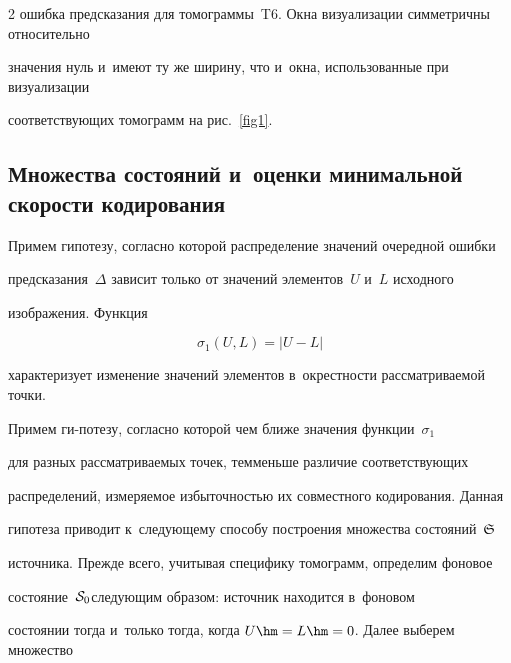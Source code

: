 \begin{multicols}{2}
ошибка предсказания для томограммы~T6. Окна визуализации симметричны относительно 

значения нуль и~имеют ту же ширину, что и~окна, использованные при визуализации 

соответствующих томограмм на рис.~\ref{fig1}.



\vspace*{-6pt}





\subsection{Множества состояний и~оценки минимальной скорости кодирования}



Примем гипотезу, согласно которой распределение значений очередной ошибки 

предсказания~$\Delta$ зависит только от значений элементов~$U$ и~$L$ исходного 

изображения. Функция



\noindent

\begin{equation}

\label{eq22}

\sigma_1(U,L)=|U-L|

\end{equation}

характеризует изменение значений элементов в~окрестности рассматриваемой точки. 

Примем ги-\linebreak потезу, согласно которой чем ближе значения функции~$\sigma_1$ 

для разных рассматриваемых точек, тем\linebreak меньше различие соответствующих 

распределений, измеряемое избыточностью их совместного кодирования. Данная 

гипотеза приводит к~сле\-ду\-юще\-му способу построения множества состояний~$\frak S$ 

источника. Прежде всего, учитывая специфику томограмм, определим фоновое 

состояние~${\cal S}_0$\linebreak   следующим образом: источник находится в~фоновом 

состоянии тогда и~только тогда, когда $U\hm=L\hm=0$. Далее выберем множество 


\end{multicols}
